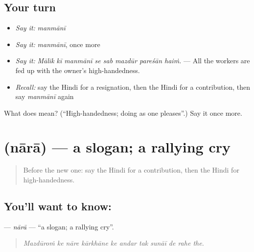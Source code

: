 \subsection*{Your turn}
\begin{itemize}
\raggedright
  \item \emph{Say it:} \emph{manmānī}
  \item \emph{Say it:} \emph{manmānī}, once more
  \item \emph{Say it:} \emph{Mālik kī manmānī se sab mazdūr pareśān haiṁ.} — All the workers are fed up with the owner's high-handedness.
  \item \emph{Recall:} say the Hindi for a resignation, then the Hindi for a contribution, then say \emph{manmānī} again
\end{itemize}

\begin{tcolorbox}[breakable,colback=teal!4,colframe=teal!35!black,title={Before you move on}]
What does  mean? (\textquotedblleft{}High-handedness; doing as one pleases\textquotedblright{}.) Say it once more.
\end{tcolorbox}
\section[\texorpdfstring{\hi{नारा} (nārā)}{नारा (nārā)}]{ (nārā) — a slogan; a rallying cry}

\label{lesson:HI-C509-nara}



\begin{quote}
Before the new one: say the Hindi for a contribution, then the Hindi for high-handedness.
\end{quote}

\subsection*{You'll want to know: }
\textbf{} — \emph{nārā} — \textquotedblleft{}a slogan; a rallying cry\textquotedblright{}.

\begin{quote}
          
\end{quote}

\begin{quote}
\emph{Mazdūroṁ ke nāre kārkhāne ke andar tak sunāī de rahe the.}
\end{quote}

